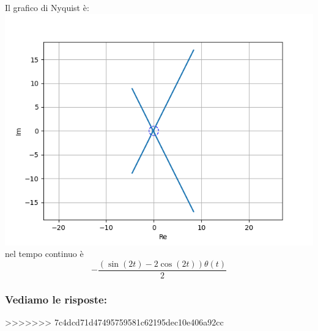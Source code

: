\documentclass{article}
\begin{document}
Il grafico di Nyquist è:
\includegraphics[scale = 0.5]{figures/nyquist_8601915.png}nel tempo continuo è \[ - \frac{\left(\sin{\left(2 t \right)} - 2 \cos{\left(2 t \right)}\right) \theta\left(t\right)}{2} \]
\subsubsection{Vediamo le risposte:} 

>>>>>>> 7c4dcd71d47495759581c62195dec10e406a92cc
\end{document}
